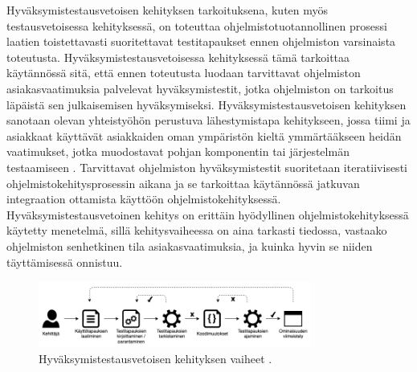   Hyväksymistestausvetoisen kehityksen tarkoituksena, kuten myös testausvetoisessa kehityksessä, on toteuttaa ohjelmistotuotannollinen prosessi laatien toistettavasti suoritettavat testitapaukset ennen ohjelmiston varsinaista toteutusta.
  Hyväksymistestausvetoisessa kehityksessä tämä tarkoittaa käytännössä sitä, että ennen toteutusta luodaan tarvittavat ohjelmiston asiakasvaatimuksia palvelevat hyväksymistestit, jotka ohjelmiston on tarkoitus läpäistä sen julkaisemisen hyväksymiseksi.
  Hyväksymistestausvetoisen kehityksen sanotaan olevan yhteistyöhön perustuva lähestymistapa kehitykseen, jossa tiimi ja asiakkaat käyttävät asiakkaiden oman ympäristön kieltä ymmärtääkseen heidän vaatimukset, jotka muodostavat pohjan komponentin tai järjestelmän testaamiseen \cite{istqb_glossary_v3_3}.
  Tarvittavat ohjelmiston hyväksymistestit suoritetaan iteratiivisesti ohjelmistokehitysprosessin aikana ja se tarkoittaa käytännössä jatkuvan integraation ottamista käyttöön ohjelmistokehityksessä.
  Hyväksymistestausvetoinen kehitys on erittäin hyödyllinen ohjelmistokehityksessä käytetty menetelmä, sillä kehitysvaiheessa on aina tarkasti tiedossa, vastaako ohjelmiston senhetkinen tila asiakasvaatimuksia, ja kuinka hyvin se niiden täyttämisessä onnistuu.

  \begin{figure}[H]
    \centering
    \includegraphics[width=0.8\textwidth]{assets/hyvaksymistestausvetoinen-kehitys.png}
    \caption{Hyväksymistestausvetoisen kehityksen vaiheet \parencite{atdd_steps}.}
    \label{fig:hyvaksymistestausvetoinen-kehitys}
  \end{figure}


